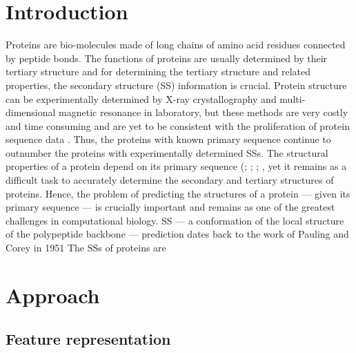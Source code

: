 \documentclass[8pt]{article}
\begin{document}
\begin{multicols}{2}
\section{Introduction}

Proteins are bio-molecules made of long chains of amino acid residues
connected by peptide bonds. The functions of proteins are usually
determined by their tertiary structure and for determining the tertiary
structure and related properties, the secondary structure (SS) information is crucial. Protein structure can be experimentally determined by
X-ray crystallography and multi-dimensional magnetic resonance in
laboratory, but these methods are very costly and time consuming
and are yet to be consistent with the proliferation of protein sequence
data \citet{jiang2017protein} . Thus, the proteins with known primary
sequence continue to outnumber the proteins with experimentally
determined SSs. The structural properties of a protein depend on its
primary sequence (\citet{anfinsen1973principles}; \citet{baker2001protein}; \citet{bradley2005toward}; \citet{dill2008protein}, yet it remains as a difficult task to accurately determine the secondary and tertiary structures of proteins.
Hence, the problem of predicting the structures of a protein — given
its primary sequence — is crucially important and remains as one of
the greatest challenges in computational biology.
SS — a conformation of the local structure of the polypeptide
backbone — prediction dates back to the work of Pauling and
Corey in 1951 \citet{pauling1951structure} The SSs of proteins are



\section{Approach}
\subsection{Feature representation}


\end{multicols}
\end{document}
